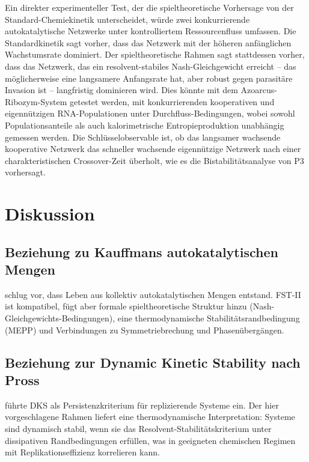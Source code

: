 \documentclass[12pt,a4paper]{article}
\theoremstyle{remark}
\begin{document}
Ein direkter experimenteller Test, der die spieltheoretische Vorhersage von der Standard-Chemiekinetik unterscheidet, würde zwei konkurrierende autokatalytische Netzwerke unter kontrolliertem Ressourcenfluss umfassen. Die Standardkinetik sagt vorher, dass das Netzwerk mit der höheren anfänglichen Wachstumsrate dominiert. Der spieltheoretische Rahmen sagt stattdessen vorher, dass das Netzwerk, das ein resolvent-stabiles Nash-Gleichgewicht erreicht -- das möglicherweise eine langsamere Anfangsrate hat, aber robust gegen parasitäre Invasion ist -- langfristig dominieren wird. Dies könnte mit dem Azoarcus-Ribozym-System getestet werden, mit konkurrierenden kooperativen und eigennützigen RNA-Populationen unter Durchfluss-Bedingungen, wobei sowohl Populationsanteile als auch kalorimetrische Entropieproduktion unabhängig gemessen werden. Die Schlüsselobservable ist, ob das langsamer wachsende kooperative Netzwerk das schneller wachsende eigennützige Netzwerk nach einer charakteristischen Crossover-Zeit überholt, wie es die Bistabilitätsanalyse von P3 vorhersagt.

\section{Diskussion}
\label{sec:discussion}

\subsection{Beziehung zu Kauffmans autokatalytischen Mengen}

\citet{Kauffman1993} schlug vor, dass Leben aus kollektiv autokatalytischen Mengen entstand. FST-II ist kompatibel, fügt aber formale spieltheoretische Struktur hinzu (Nash-Gleichgewichts-Bedingungen), eine thermodynamische Stabilitätsrandbedingung (MEPP) und Verbindungen zu Symmetriebrechung und Phasenübergängen.

\subsection{Beziehung zur Dynamic Kinetic Stability nach Pross}

\citet{Pross2012} führte DKS als Persistenzkriterium für replizierende Systeme ein. Der hier vorgeschlagene Rahmen liefert eine thermodynamische Interpretation: Systeme sind dynamisch stabil, wenn sie das Resolvent-Stabilitätskriterium unter dissipativen Randbedingungen erfüllen, was in geeigneten chemischen Regimen mit Replikationseffizienz korrelieren kann.
\end{document}
